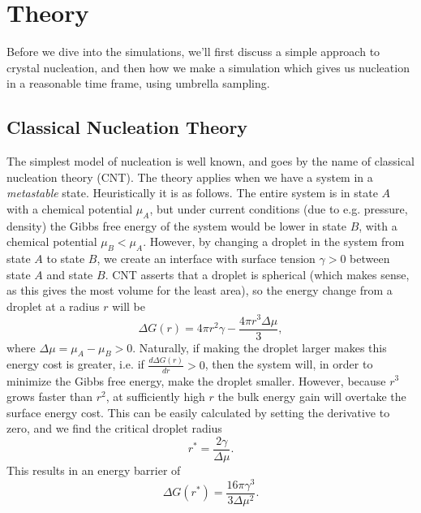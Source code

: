 \documentclass[thesis]{subfiles}
\begin{document}
\section{Theory}

Before we dive into the simulations, we'll first discuss a simple approach to crystal nucleation, and then how we make a simulation which gives us nucleation in a reasonable time frame, using umbrella sampling.

\subsection{Classical Nucleation Theory}

The simplest model of nucleation is well known, and goes by the name of classical nucleation theory (CNT). The theory applies when we have a system in a \emph{metastable} state. Heuristically it is as follows. The entire system is in state $A$ with a chemical potential $\mu_A$, but under current conditions (due to e.g. pressure, density) the Gibbs free energy of the system would be lower in state $B$, with a chemical potential $\mu_B < \mu_A$. However, by changing a droplet in the system from state $A$ to state $B$, we create an interface with surface tension $\gamma > 0$ between state $A$ and state $B$. CNT asserts that a droplet is spherical (which makes sense, as this gives the most volume for the least area), so the energy change from a droplet at a radius $r$ will be
\begin{equation}
	\Delta G(r) = 4\pi r^2 \gamma - \frac{4\pi r^3 \Delta\mu}{3},
\end{equation}
where $\Delta\mu = \mu_A - \mu_B > 0$. Naturally, if making the droplet larger makes this energy cost is greater, i.e. if $\frac{d\Delta G(r)}{dr} > 0$, %
then the system will, in order to minimize the Gibbs free energy, make the droplet smaller. However, because $r^3$ grows faster than $r^2$, at sufficiently high $r$ the bulk energy gain will overtake the surface energy cost. This can be easily calculated by setting the derivative to zero, and we find the critical droplet radius
\begin{equation}
	r^* = \frac{2\gamma}{\Delta\mu}.
\end{equation}
This results in an energy barrier of 
\begin{equation}
	\Delta G (r^*) = \frac{16 \pi \gamma^3}{3 \Delta\mu^2}.
\end{equation}
\end{document}
